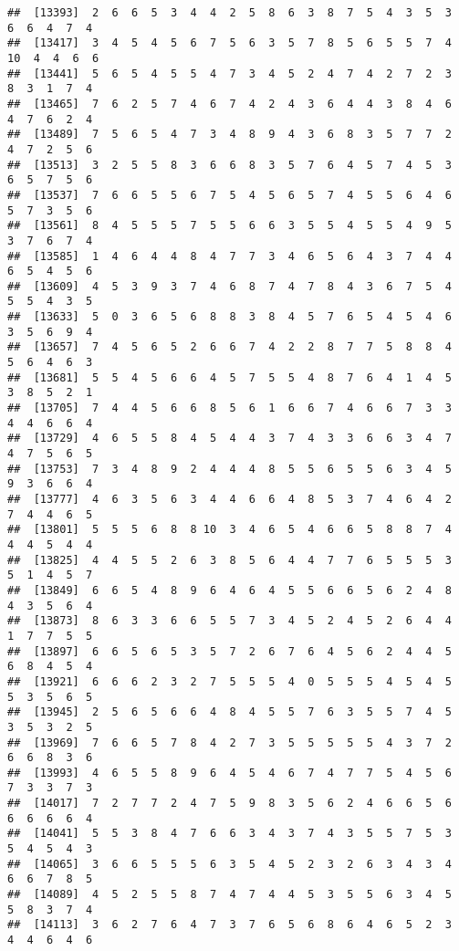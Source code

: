 \documentclass[
]{book}
\begin{document}
\begin{verbatim}
##  [13393]  2  6  6  5  3  4  4  2  5  8  6  3  8  7  5  4  3  5  3  6  6  4  7  4
##  [13417]  3  4  5  4  5  6  7  5  6  3  5  7  8  5  6  5  5  7  4 10  4  4  6  6
##  [13441]  5  6  5  4  5  5  4  7  3  4  5  2  4  7  4  2  7  2  3  8  3  1  7  4
##  [13465]  7  6  2  5  7  4  6  7  4  2  4  3  6  4  4  3  8  4  6  4  7  6  2  4
##  [13489]  7  5  6  5  4  7  3  4  8  9  4  3  6  8  3  5  7  7  2  4  7  2  5  6
##  [13513]  3  2  5  5  8  3  6  6  8  3  5  7  6  4  5  7  4  5  3  6  5  7  5  6
##  [13537]  7  6  6  5  5  6  7  5  4  5  6  5  7  4  5  5  6  4  6  5  7  3  5  6
##  [13561]  8  4  5  5  5  7  5  5  6  6  3  5  5  4  5  5  4  9  5  3  7  6  7  4
##  [13585]  1  4  6  4  4  8  4  7  7  3  4  6  5  6  4  3  7  4  4  6  5  4  5  6
##  [13609]  4  5  3  9  3  7  4  6  8  7  4  7  8  4  3  6  7  5  4  5  5  4  3  5
##  [13633]  5  0  3  6  5  6  8  8  3  8  4  5  7  6  5  4  5  4  6  3  5  6  9  4
##  [13657]  7  4  5  6  5  2  6  6  7  4  2  2  8  7  7  5  8  8  4  5  6  4  6  3
##  [13681]  5  5  4  5  6  6  4  5  7  5  5  4  8  7  6  4  1  4  5  3  8  5  2  1
##  [13705]  7  4  4  5  6  6  8  5  6  1  6  6  7  4  6  6  7  3  3  4  4  6  6  4
##  [13729]  4  6  5  5  8  4  5  4  4  3  7  4  3  3  6  6  3  4  7  4  7  5  6  5
##  [13753]  7  3  4  8  9  2  4  4  4  8  5  5  6  5  5  6  3  4  5  9  3  6  6  4
##  [13777]  4  6  3  5  6  3  4  4  6  6  4  8  5  3  7  4  6  4  2  7  4  4  6  5
##  [13801]  5  5  5  6  8  8 10  3  4  6  5  4  6  6  5  8  8  7  4  4  4  5  4  4
##  [13825]  4  4  5  5  2  6  3  8  5  6  4  4  7  7  6  5  5  5  3  5  1  4  5  7
##  [13849]  6  6  5  4  8  9  6  4  6  4  5  5  6  6  5  6  2  4  8  4  3  5  6  4
##  [13873]  8  6  3  3  6  6  5  5  7  3  4  5  2  4  5  2  6  4  4  1  7  7  5  5
##  [13897]  6  6  5  6  5  3  5  7  2  6  7  6  4  5  6  2  4  4  5  6  8  4  5  4
##  [13921]  6  6  6  2  3  2  7  5  5  5  4  0  5  5  5  4  5  4  5  5  3  5  6  5
##  [13945]  2  5  6  5  6  6  4  8  4  5  5  7  6  3  5  5  7  4  5  3  5  3  2  5
##  [13969]  7  6  6  5  7  8  4  2  7  3  5  5  5  5  5  4  3  7  2  6  6  8  3  6
##  [13993]  4  6  5  5  8  9  6  4  5  4  6  7  4  7  7  5  4  5  6  7  3  3  7  3
##  [14017]  7  2  7  7  2  4  7  5  9  8  3  5  6  2  4  6  6  5  6  6  6  6  6  4
##  [14041]  5  5  3  8  4  7  6  6  3  4  3  7  4  3  5  5  7  5  3  5  4  5  4  3
##  [14065]  3  6  6  5  5  5  6  3  5  4  5  2  3  2  6  3  4  3  4  6  6  7  8  5
##  [14089]  4  5  2  5  5  8  7  4  7  4  4  5  3  5  5  6  3  4  5  5  8  3  7  4
##  [14113]  3  6  2  7  6  4  7  3  7  6  5  6  8  6  4  6  5  2  3  4  4  6  4  6

\end{verbatim}
\end{document}
